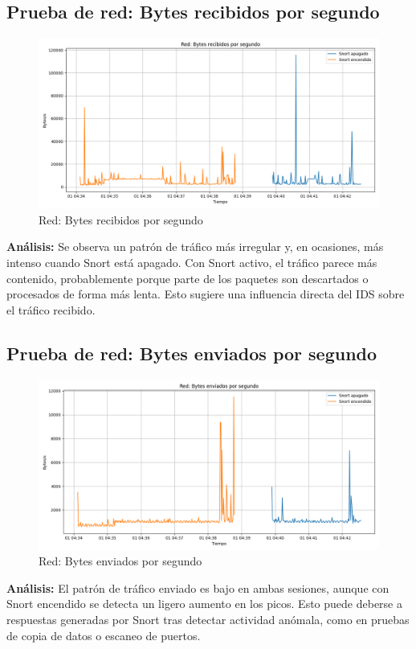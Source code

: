\documentclass[11pt,a4paper,twoside]{report}
\begin{document}
\subsection*{Prueba de red: Bytes recibidos por segundo}

\begin{figure}[H]
	\centering
	\includegraphics[width=\textwidth]{graficas/net_recv.png}
	\caption{Red: Bytes recibidos por segundo}
\end{figure}
\textbf{Análisis:} Se observa un patrón de tráfico más irregular y, en ocasiones, más intenso cuando Snort está apagado. Con Snort activo, el tráfico parece más contenido, probablemente porque parte de los paquetes son descartados o procesados de forma más lenta. Esto sugiere una influencia directa del IDS sobre el tráfico recibido.

\subsection*{Prueba de red: Bytes enviados por segundo}

\begin{figure}[H]
	\centering
	\includegraphics[width=\textwidth]{graficas/net_send.png}
	\caption{Red: Bytes enviados por segundo}
\end{figure}
\textbf{Análisis:} El patrón de tráfico enviado es bajo en ambas sesiones, aunque con Snort encendido se detecta un ligero aumento en los picos. Esto puede deberse a respuestas generadas por Snort tras detectar actividad anómala, como en pruebas de copia de datos o escaneo de puertos.
\end{document}
